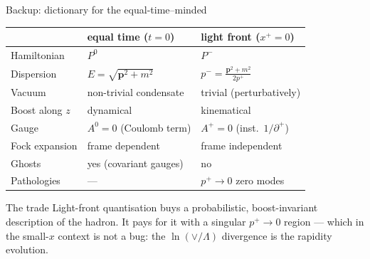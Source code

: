 \documentclass[9pt,aspectratio=169]{beamer}
\newcommand{\hl}[1]{\textcolor{acc}{#1}}
\newcommand{\pp}{p^{+}}
\newcommand{\xp}{x^{+}}
\begin{document}
\begin{frame}{Backup: dictionary for the equal-time--minded}
\begin{center}
\small
\begin{tabular}{p{3.0cm}p{4.6cm}p{4.0cm}}
\toprule
& \textbf{equal time} ($t=0$) & \textbf{light front} ($\xp=0$)\\
\midrule
Hamiltonian & $P^{0}$ & $P^{-}$\\
Dispersion & $E=\sqrt{\bm p^{2}+m^{2}}$ & $p^{-}=\frac{\bm p^{2}+m^{2}}{2\pp}$\\
Vacuum & non-trivial condensate & \hl{trivial} (perturbatively)\\
Boost along $z$ & dynamical & \hl{kinematical}\\
Gauge & $A^{0}=0$ (Coulomb term) & $A^{+}=0$ (inst.\ $1/\partial^{+}$)\\
Fock expansion & frame dependent & \hl{frame independent}\\
Ghosts & yes (covariant gauges) & no\\
Pathologies & --- & $\pp\to0$ zero modes\\
\bottomrule
\end{tabular}
\end{center}
\medskip
\begin{block}{The trade}
Light-front quantisation buys a probabilistic, boost-invariant description of the
hadron. It pays for it with a singular $\pp\to0$ region --- which in the small-$x$
context is not a bug: the $\ln(\vee/\Lambda)$ divergence \hl{is} the rapidity evolution.
\end{block}
\end{frame}
\end{document}

